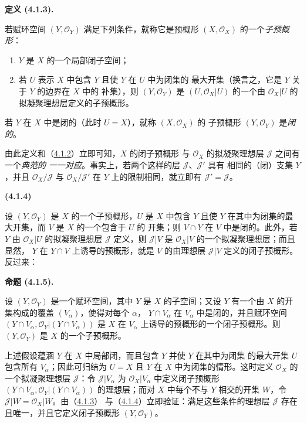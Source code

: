 \documentclass[UTF8,fontset=none,11pt,oneside,openany]{ctexbook}
\newenvironment{env}[1][]{%
  \par\medskip\noindent\textbf{(#1)}\ %
}{\par}
\newenvironment{definition}[1][]{%
  \par\medskip\noindent\textbf{定义 (#1).}\ %
}{\par}
\newenvironment{proposition}[1][]{%
  \par\medskip\noindent\textbf{命题 (#1).}\ %
}{\par}
\let\EGAOriginalLabel\label
\renewcommand{\label}[1]{\phantomsection\EGAOriginalLabel{#1}}
\begin{document}
\begin{definition}[4.1.3]
\label{I.4.1.3-fr}
若赋环空间 $(Y,\mathscr{O}_Y)$ 满足下列条件，就称它是预概形
$(X,\mathscr{O}_X)$ 的一个\emph{子预概形}：
\begin{enumerate}
  \item[$1^\circ$] $Y$ 是 $X$ 的一个局部闭子空间；
  \item[$2^\circ$] 若 $U$ 表示 $X$ 中包含 $Y$ 且使 $Y$ 在 $U$ 中为闭集的
  最大开集（换言之，它是 $Y$ 关于 $\overline{Y}$ 的边界在 $X$ 中的
  补集），则 $(Y,\mathscr{O}_Y)$ 是 $(U,\mathscr{O}_X|U)$ 的一个由
  $\mathscr{O}_X|U$ 的拟凝聚理想层定义的子预概形。
\end{enumerate}
若 $Y$ 在 $X$ 中是闭的（此时 $U=X$），就称 $(X,\mathscr{O}_X)$ 的
子预概形 $(Y,\mathscr{O}_Y)$ 是\emph{闭的}。
\end{definition}

由此定义和（\hyperref[I.4.1.2-fr]{4.1.2}）立即可知，$X$ 的闭子预概形
与 $\mathscr{O}_X$ 的拟凝聚理想层 $\mathscr{J}$ 之间有一个\emph{典范的
一一对应}。事实上，若两个这样的层 $\mathscr{J}$、$\mathscr{J}'$ 具有
相同的（闭）支集 $Y$，并且 $\mathscr{O}_X/\mathscr{J}$ 与
$\mathscr{O}_X/\mathscr{J}'$ 在 $Y$ 上的限制相同，就立即有
$\mathscr{J}'=\mathscr{J}$。

\begin{env}[4.1.4]
\label{I.4.1.4-fr}
设 $(Y,\mathscr{O}_Y)$ 是 $X$ 的一个子预概形，$U$ 是 $X$ 中包含 $Y$
且使 $Y$ 在其中为闭集的最大开集，而 $V$ 是 $X$ 的一个包含于 $U$ 的
开集；则 $V\cap Y$ 在 $V$ 中是闭的。此外，若 $Y$ 由
$\mathscr{O}_X|U$ 的拟凝聚理想层 $\mathscr{J}$ 定义，则
$\mathscr{J}|V$ 是 $\mathscr{O}_X|V$ 的一个拟凝聚理想层；而且显然，
$Y$ 在 $Y\cap V$ 上诱导的预概形，就是 $V$ 的由理想层
$\mathscr{J}|V$ 定义的闭子预概形。反过来：
\end{env}

\begin{proposition}[4.1.5]
\label{I.4.1.5-fr}
设 $(Y,\mathscr{O}_Y)$ 是一个赋环空间，其中 $Y$ 是 $X$ 的子空间；又设
$Y$ 有一个由 $X$ 的开集构成的覆盖 $(V_\alpha)$，使得对每个 $\alpha$，
$Y\cap V_\alpha$ 在 $V_\alpha$ 中是闭的，并且赋环空间
$(Y\cap V_\alpha,\mathscr{O}_Y|(Y\cap V_\alpha))$ 是 $X$ 在
$V_\alpha$ 上诱导的预概形的一个闭子预概形。则
$(Y,\mathscr{O}_Y)$ 是 $X$ 的一个子预概形。
\end{proposition}

上述假设蕴涵 $Y$ 在 $X$ 中局部闭，而且包含 $Y$ 并使 $Y$ 在其中为闭集
的最大开集 $U$ 包含所有 $V_\alpha$；因此可归结为 $U=X$ 且 $Y$ 在
$X$ 中为闭集的情形。这时定义 $\mathscr{O}_X$ 的一个拟凝聚理想层
$\mathscr{J}$：令 $\mathscr{J}|V_\alpha$ 为 $\mathscr{O}_X|V_\alpha$
中定义闭子预概形
$(Y\cap V_\alpha,\mathscr{O}_Y|(Y\cap V_\alpha))$ 的理想层；而对 $X$
中每个不与 $Y$ 相交的开集 $W$，令
$\mathscr{J}|W=\mathscr{O}_X|W$。由（\hyperref[I.4.1.3-fr]{4.1.3}）
与（\hyperref[I.4.1.4-fr]{4.1.4}）立即验证：满足这些条件的理想层
$\mathscr{J}$ 存在且唯一，并且它定义闭子预概形
$(Y,\mathscr{O}_Y)$。
\end{document}
